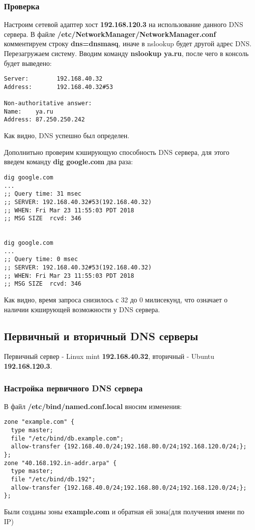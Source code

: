 \documentclass[a4paper, 12pt]{article}		%
\begin{document}
\subsubsection{Проверка}
Настроим сетевой адаптер хост \textbf{192.168.120.3} на использование данного DNS сервера. В файле \textbf{/etc/NetworkManager/NetworkManager.conf} комментируем строку \textbf{dns=dnsmasq}, иначе в nslookup будет другой адрес DNS. Перезагружаем систему. Вводим команду \textbf{nslookup ya.ru}, после чего в консоль будет выведено:
\begin{lstlisting}[language={}]
Server:        192.168.40.32
Address:       192.168.40.32#53

Non-authoritative answer:
Name:    ya.ru
Address: 87.250.250.242
\end{lstlisting}
Как видно, DNS успешно был определен.

Дополнитьно проверим кэширующую способность DNS сервера, для этого введем команду \textbf{dig google.com} два раза:
\begin{lstlisting}[language={}]
dig google.com
...
;; Query time: 31 msec
;; SERVER: 192.168.40.32#53(192.168.40.32)
;; WHEN: Fri Mar 23 11:55:03 PDT 2018
;; MSG SIZE  rcvd: 346


dig google.com
...
;; Query time: 0 msec
;; SERVER: 192.168.40.32#53(192.168.40.32)
;; WHEN: Fri Mar 23 11:55:03 PDT 2018
;; MSG SIZE  rcvd: 346
\end{lstlisting}
Как видно, время запроса снизилось с 32 до 0 милисекунд, что означает о наличии кэширующей возможности у DNS сервера.

\subsection{Первичный и вторичный DNS серверы}
Первичный сервер - Linux mint \textbf{192.168.40.32}, вторичный - Ubuntu \textbf{192.168.120.3}.
\subsubsection{Настройка первичного DNS сервера}
В файл \textbf{/etc/bind/named.conf.local} вносим изменения:
\begin{lstlisting}[language={}]
zone "example.com" {
  type master;
  file "/etc/bind/db.example.com";
  allow-transfer {192.168.40.0/24;192.168.80.0/24;192.168.120.0/24;};
};
zone "40.168.192.in-addr.arpa" {
  type master;
  file "/etc/bind/db.192";
  allow-transfer {192.168.40.0/24;192.168.80.0/24;192.168.120.0/24;};
}; 
\end{lstlisting}
Были созданы зоны \textbf{example.com} и обратная ей зона(для получения имени по IP)
\end{document}
